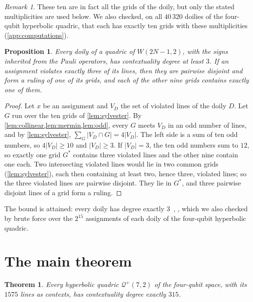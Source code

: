 \documentclass[11pt]{article}
\newtheorem{theorem}{Theorem}
\newtheorem{proposition}[proposition]{Proposition}
\theoremstyle{definition}
\theoremstyle{remark}
\newtheorem{remark}[remark]{Remark}
\newcommand{\Qp}{\mathcal{Q}^{+}}
\begin{document}
\begin{remark}
These ten are in fact all the grids of the doily, but only the stated multiplicities are used below. We also checked, on all $40\,320$ doilies of the four-qubit hyperbolic quadric, that each has exactly ten grids with these multiplicities (\cref{app:computations}).
\end{remark}

\begin{proposition}\label{prop:doily}
Every doily of a quadric of $W(2N-1,2)$, with the signs inherited from the Pauli operators, has contextuality degree at least $3$. If an assignment violates exactly three of its lines, then they are pairwise disjoint and form a ruling of one of its grids, and each of the other nine grids contains exactly one of them.
\end{proposition}
\begin{proof}
Let $x$ be an assignment and $V_D$ the set of violated lines of the doily $D$.
Let $G$ run over the ten grids of \cref{lem:sylvester}.
By \cref{lem:collinear,lem:mermin,lem:odd}, every $G$ meets $V_D$ in an odd number of lines, and by \cref{lem:sylvester}, $\sum_G|V_D\cap G|=4|V_D|$.
The left side is a sum of ten odd numbers, so $4|V_D|\ge10$ and $|V_D|\ge3$.
If $|V_D|=3$, the ten odd numbers sum to $12$, so exactly one grid $G^*$ contains three violated lines and the other nine contain one each.
Two intersecting violated lines would lie in two common grids (\cref{lem:sylvester}), each then containing at least two, hence three, violated lines; so the three violated lines are pairwise disjoint.
They lie in $G^*$, and three pairwise disjoint lines of a grid form a ruling.
\end{proof}

The bound is attained: every doily has degree exactly $3$~\cite[Prop.~1]{Muller22doilies}, \cite{deBoutray22}, which we also checked by brute force over the $2^{15}$ assignments of each doily of the four-qubit hyperbolic quadric.

\section{The main theorem}\label{sec:main}

\begin{theorem}\label{thm:main}
Every hyperbolic quadric $\Qp(7,2)$ of the four-qubit space, with its $1575$ lines as contexts, has contextuality degree exactly $315$.
\end{theorem}
\end{document}
